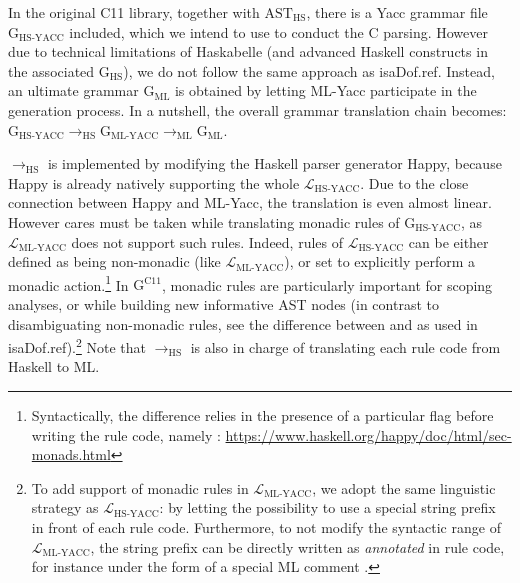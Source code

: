 \begin{isabellebody}
\begin{isamarkuptext}
In the original C11 library, together with $\text{AST}_{\text{HS}}$, there is a Yacc
grammar file $\text{G}_{\text{HS-YACC}}$ included, which we intend to use to conduct the C
parsing. However due to technical limitations of Haskabelle (and advanced Haskell constructs in the
associated $\text{G}_{\text{HS}}$), we do not follow the same approach as \csname isaDof.ref. Instead, an ultimate grammar $\text{G}_{\text{ML}}$ is obtained by letting
ML-Yacc participate in the generation process. In a nutshell, the overall grammar translation chain
becomes: $\text{G}_{\text{HS-YACC}} \longrightarrow_{\text{HS}} \text{G}_{\text{ML-YACC}}
\longrightarrow_{\text{ML}} \text{G}_{\text{ML}}$.

$\longrightarrow_{\text{HS}}$ is implemented by modifying the Haskell parser generator Happy,
because Happy is already natively supporting the whole $\mathcal{L}_{\text{HS-YACC}}$. Due to the
close connection between Happy and ML-Yacc, the translation is even almost linear. However cares
must be taken while translating monadic rules of $\text{G}_{\text{HS-YACC}}$, as
$\mathcal{L}_{\text{ML-YACC}}$ does not support such rules. Indeed, rules of
$\mathcal{L}_{\text{HS-YACC}}$ can be either defined as being non-monadic (like
$\mathcal{L}_{\text{ML-YACC}}$), or set to explicitly perform a monadic action.\footnote{Syntactically, the difference relies in the presence of a particular flag before writing
  the rule code, namely :
  \url{https://www.haskell.org/happy/doc/html/sec-monads.html}} In
$\text{G}^{\text{C11}}$, monadic rules are particularly important for scoping analyses, or while
building new informative AST nodes (in contrast to disambiguating non-monadic rules, see the
difference between \isa{{\isacharat}} and \isa{{\isacharampersand}} as used in
\csname isaDof.ref).\footnote{To add support of monadic rules in
  $\mathcal{L}_{\text{ML-YACC}}$, we adopt the same linguistic strategy as
  $\mathcal{L}_{\text{HS-YACC}}$: by letting the possibility to use a special string prefix in front
  of each rule code. Furthermore, to not modify the syntactic range of
  $\mathcal{L}_{\text{ML-YACC}}$, the string prefix can be directly written as
  \emph{annotated} in rule code, for instance under the form of a special ML comment
  .} Note that $\longrightarrow_{\text{HS}}$ is also in charge of
translating each rule code from Haskell to ML.


\end{isamarkuptext}
\end{isabellebody}
